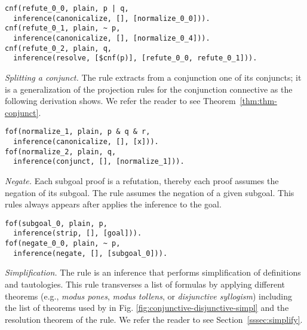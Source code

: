 \documentclass[../main.tex]{subfiles}
\begin{document}
\begin{verbatim}
cnf(refute_0_0, plain, p | q,
  inference(canonicalize, [], [normalize_0_0])).
cnf(refute_0_1, plain, ~ p,
  inference(canonicalize, [], [normalize_0_4])).
cnf(refute_0_2, plain, q,
  inference(resolve, [$cnf(p)], [refute_0_0, refute_0_1])).
\end{verbatim}


\textit{Splitting a conjunct.} The \conjunct rule extracts from a
conjunction one of its conjuncts; it is a generalization of the
projection rules for the conjunction connective as the
following \TSTP derivation shows.
We refer the reader to see Theorem~\ref{thm:thm-conjunct}.

\begin{verbatim}
fof(normalize_1, plain, p & q & r,
  inference(canonicalize, [], [x])).
fof(normalize_2, plain, q,
  inference(conjunct, [], [normalize_1])).
\end{verbatim}

\textit{Negate.}
Each subgoal proof is a refutation, thereby each proof assumes
the negation of its subgoal. The \negate rule
assumes the negation of a given subgoal. This rules always
appears after applies the \strip inference to the goal.

\begin{verbatim}
fof(subgoal_0, plain, p,
  inference(strip, [], [goal])).
fof(negate_0_0, plain, ~ p,
  inference(negate, [], [subgoal_0])).
\end{verbatim}


\textit{Simplification.}
The \simplify rule is an inference that performs simplification of
definitions and tautologies. This rule
transverses a list of formulas by applying different theorems (e.g.,
\emph{modus pones}, \emph{modus tollens}, or \emph{disjunctive
syllogism}) including the list of theorems used by \canonicalize in
Fig. \ref{fig:conjunctive-disjunctive-simpl} and the resolution
theorem of the \resolve rule.
We refer the reader to see Section~\ref{sssec:simplify}.
\end{document}
